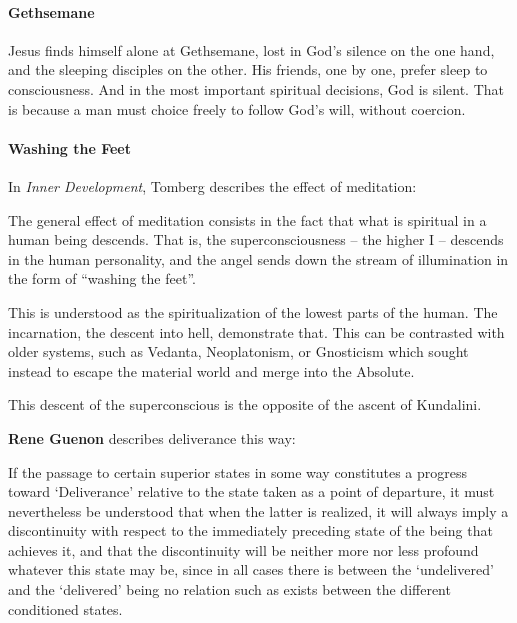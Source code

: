 \paragraph{Gethsemane}


Jesus finds himself alone at Gethsemane, lost in God's silence on the one hand, and the sleeping disciples on the other. His friends, one by one, prefer sleep to consciousness. And in the most important spiritual decisions, God is silent. That is because a man must choice freely to follow God's will, without coercion.

\paragraph{Washing the Feet}


In \textit{Inner Development}, Tomberg describes the effect of meditation:

\begin{quotex}
The general effect of meditation consists in the fact that what is spiritual in a human being descends. That is, the superconsciousness -- the higher I -- descends in the human personality, and the angel sends down the stream of illumination in the form of ``washing the feet''.
\end{quotex}


This is understood as the spiritualization of the lowest parts of the human. The incarnation, the descent into hell, demonstrate that. This can be contrasted with older systems, such as Vedanta, Neoplatonism, or Gnosticism which sought instead to escape the material world and merge into the Absolute.

This descent of the superconscious is the opposite of the ascent of Kundalini.

\textbf{Rene Guenon} describes deliverance this way:


\begin{quotex}
If the passage to certain superior states in some way constitutes a progress toward `Deliverance' relative to the state taken as a point of departure, it must nevertheless be understood that when the latter is realized, it will always imply a discontinuity with respect to the immediately preceding state of the being that achieves it, and that the discontinuity will be neither more nor less profound whatever this state may be, since in all cases there is between the `undelivered' and the `delivered' being no relation such as exists between the different conditioned states.
\end{quotex}


